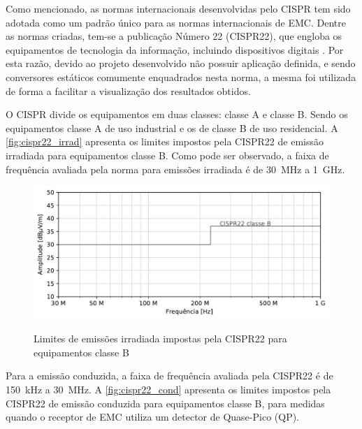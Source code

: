             Como mencionado, as normas internacionais desenvolvidas pelo CISPR tem sido adotada como um padrão único para as normas internacionais de EMC. Dentre as normas criadas, tem-se a publicação Número 22 (CISPR22), que engloba os equipamentos de tecnologia da informação, incluindo dispositivos digitais \cite{ref:EMC_phd_schlichting}. 
            Por esta razão, devido ao projeto desenvolvido não possuir aplicação definida, e sendo conversores estáticos comumente enquadrados nesta norma, a mesma foi utilizada de forma a facilitar a visualização dos resultados obtidos. 
            
            O CISPR divide os equipamentos em duas classes: classe A e classe B. Sendo os equipamentos classe A de uso industrial e os de classe B de uso residencial. A \autoref{fig:cispr22_irrad} apresenta os limites impostos pela CISPR22 de emissão irradiada para equipamentos classe B. Como pode ser observado, a  faixa de frequência avaliada pela norma para emissões irradiada é de \qty{30}{\mega\hertz} a  \qty{1}{\giga\hertz}.
            
            \begin{figure}[H]
            	\centering
            	\caption{Limites de emissões irradiada impostas pela CISPR22 para equipamentos classe B}
            	\includegraphics[scale=.9]{pdf/rad/norma_rad.pdf}
            	\label{fig:cispr22_irrad}
            \end{figure}
            
            Para a emissão conduzida, a faixa de frequência avaliada pela CISPR22 é de \qty{150}{\kilo\hertz} a  \qty{30}{\mega\hertz}. A \autoref{fig:cispr22_cond} apresenta os limites impostos pela CISPR22 de emissão conduzida para equipamentos classe B, para medidas quando o receptor de EMC utiliza um detector de Quase-Pico (QP).
            
